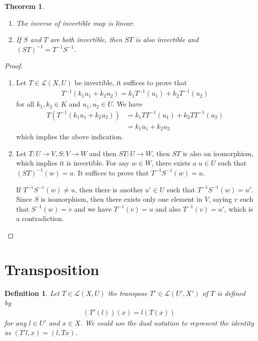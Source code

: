 \documentclass[11pt]{book}
\newtheorem{definition}{Definition}[section]
\newtheorem{theorem}{Theorem}[section]
\theoremstyle{definition}
\numberwithin{equation}{chapter}
\begin{document}
\begin{theorem}
~\begin{enumerate}[label=(\alph*)]
    \item The inverse of invertible map is linear.
    \item If $S$ and $T$ are both invertible, then $ST$ is also invertible and $(ST)^{-1} = T^{-1} S^{-1}$.
\end{enumerate}
\end{theorem}
\begin{proof}
~\begin{enumerate}[label=(\alph*)]
    \item Let $T\in \mathscr{L}(X,U)$ be invertible, it suffices to prove that 
    \begin{align*}
        T^{-1}(k_1 u_1+k_2 u_2) = k_1 T^{-1}(u_1) + k_2 T^{-1}(u_2)
    \end{align*}
    for all $k_1,k_2\in K$ and $u_1,u_2\in U$. We have
    \begin{align*}
        T \left(T^{-1}(k_1 u_1+k_2 u_2)\right) & = k_1 TT^{-1}(u_1) + k_2 TT^{-1}(u_2) \\
        & = k_1 u_1 + k_2 u_2
    \end{align*}
    which implies the above indication.
    \item Let $T:U\to V, S:V\to W$ and then $ST:U\to W$, then $ST$ is also an isomorphism, which implies it is invertible. For any $w\in W$, there exists a $u\in U$ such that $(ST)^{-1}(w) = u$. It suffices to prove that $T^{-1} S^{-1}(w) = u$.
    
    If $T^{-1} S^{-1}(w)\neq u$, then there is another $u'\in U$ such that $T^{-1} S^{-1}(w) = u'$. Since $S$ is isomorphism, then there exists only one element in $V$, saying $v$ such that $S^{-1}(w) = v$ and we have $T^{-1}(v) = u$ and also $T^{-1}(v) = u'$, which is a contradiction.
\end{enumerate}
\end{proof}

\medskip

\section{Transposition}
\begin{definition}
Let $T\in \mathscr{L}(X,U)$ the transpose $T'\in \mathscr{L}(U',X')$ of $T$ is defined by 
\begin{align*}
    \left(T'(l)\right)(x) = l(T(x))
\end{align*}
for any $l\in U'$ and $x\in X$. We could use the dual notation to represent the identity as $(T' l,x) = (l, Tx)$.
\end{definition}
\end{document}
